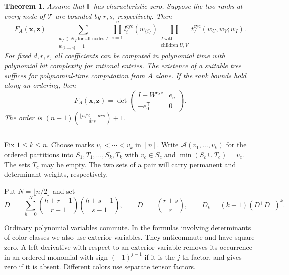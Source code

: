 \documentclass[11pt,reqno]{amsart}
\newtheorem{theorem}{Theorem}[section]
\theoremstyle{remark}
\numberwithin{equation}{section}
\newcommand{\F}{\mathbb F}
\begin{document}
\begin{theorem}\label{thm:cycle-covers}
Assume that \(\F\) has characteristic zero. Suppose the two ranks at every node of \(\mathcal T\) are bounded
by \(r,s\), respectively. Then
\begin{equation}\label{eq:cycle-tree-formula}
 F_A(\boldsymbol x,\boldsymbol z)=
 \sum_{\substack{w_I\in\mathcal N_I\ \text{for all nodes }I\\
                 w_{\{1,\ldots,n\}}=1}}
 \prod_{i=1}^n l_i^{\mathrm{cyc}}(w_{\{i\}})
 \prod_{\substack{I\ \text{with}\\\text{children }U,V}}
    t_I^{\mathrm{cyc}}(w_U,w_V;w_I).
\end{equation}
For fixed \(d,r,s\), all coefficients can be computed in
polynomial time with polynomial bit complexity for rational
entries. The existence of a suitable tree suffices for
polynomial-time computation from \(A\) alone.
If the rank bounds hold along an ordering, then
\begin{equation}\label{eq:cycle-border}
 F_A(\boldsymbol x,\boldsymbol z)=
 \det\begin{pmatrix}
        I-W^{\mathrm{cyc}}&e_n\\
        -e_0^{\mathsf T}&0
      \end{pmatrix}.
\end{equation}
The order is \((n+1)\binom{\lfloor n/2\rfloor+drs}{drs}+1\).
\end{theorem}

\subsection{}

Fix \(1\le k\le n\). Choose marks \(v_1<\cdots<v_k\) in
\([n]\). Write \(\mathcal A(v_1,\ldots,v_k)\) for the ordered
partitions into \(S_1,T_1,\ldots,S_k,T_k\) with \(v_c\in S_c\)
and \(\min(S_c\cup T_c)=v_c\). The sets \(T_c\) may be empty.
The two sets of a pair will carry permanent and determinant
weights, respectively.

Put \(N=\lfloor n/2\rfloor\) and set
\begin{equation}\label{eq:fixed-cycle-dimension}
 D^+=\sum_{h=0}^N\binom{h+r-1}{r-1}\binom{h+s-1}{s-1},
 \qquad D^-=\binom{r+s}{r},\qquad
 D_k=(k+1)(D^+D^-)^k .
\end{equation}

Ordinary polynomial variables commute. In the formulas involving
determinants of color classes we also use exterior variables.
They anticommute and have square zero. A left derivative with
respect to an exterior variable removes its occurrence in an
ordered monomial with sign \((-1)^{j-1}\) if it is the \(j\)-th
factor, and gives zero if it is absent. Different colors use
separate tensor factors.
\end{document}
